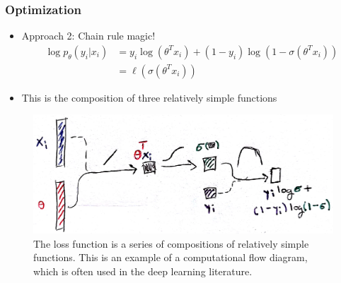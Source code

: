 \documentclass[10pt,mathserif]{beamer}
\begin{document}
\begin{frame}
  \frametitle{Optimization}
  \begin{itemize}
  \item Approach 2: Chain rule magic!
    \begin{align*}
      \log p_{\theta}\left(y_i \vert x_i\right)  &= y_i \log\left(\theta^T x_i\right) + \left(1 - y_i\right) \log\left(1 - \sigma\left(\theta^T x_i\right)\right) \\
      &= \ell\left(\sigma\left(\theta^T x_{i}\right)\right)
    \end{align*}
  \item This is the composition of three relatively simple functions
  \end{itemize}
\begin{figure}[ht]
  \centering
  \includegraphics[width=0.7\paperwidth]{figure/logistic_comp_graph}
  \caption{The loss function is a series of compositions of relatively simple
    functions. This is an example of a computational flow diagram, which is
    often used in the deep learning literature.
    \label{fig:logistic_comp_graph} }
\end{figure}
\end{frame}
\end{document}
